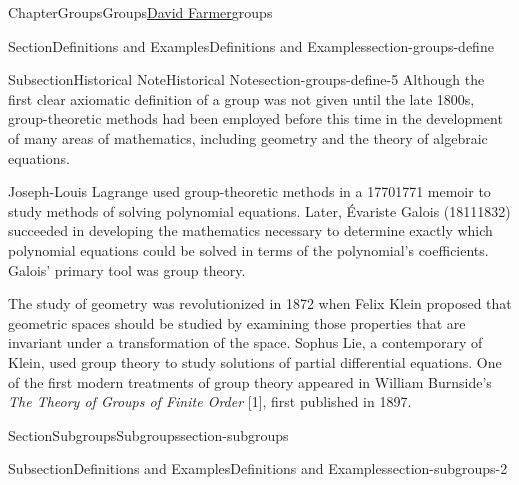 \documentclass[oneside,10pt,]{book}
\newcommand{\pubtitle}[1]{\textsl{#1}}
\numberwithin{equation}{section}
\begin{document}
\begin{chapterptx}{Chapter}{Groups}{}{Groups}{\hyperlink{dfarmer}{David Farmer}}{}{groups}
\begin{sectionptx}{Section}{Definitions and Examples}{}{Definitions and Examples}{}{}{section-groups-define}
\begin{subsectionptx}{Subsection}{Historical Note}{}{Historical Note}{}{}{section-groups-define-5}
Although the first clear axiomatic definition of a group was not given until the late 1800s, group-theoretic methods had been employed before this time in the development of  many areas of mathematics, including geometry and the theory of algebraic equations.%
\par
Joseph-Louis Lagrange used group-theoretic methods in a 1770\textendash{}1771 memoir to study methods of solving polynomial equations.  Later, Évariste Galois (1811\textendash{}1832) succeeded in developing the mathematics necessary to determine exactly which polynomial equations could be  solved in terms of the polynomial's coefficients. Galois' primary tool was group theory.%
\par
The study of geometry was revolutionized in 1872 when Felix Klein proposed that geometric spaces should be studied by examining those properties that are invariant under a transformation of the space. Sophus Lie, a contemporary of Klein, used group theory to study solutions of partial differential equations.  One of the first modern treatments of group theory appeared in William Burnside's \pubtitle{The Theory of Groups of Finite Order} [1], first published in 1897.%
\end{subsectionptx}
\end{sectionptx}
%
%
\typeout{************************************************}
\typeout{************************************************}
%
\begin{sectionptx}{Section}{Subgroups}{}{Subgroups}{}{}{section-subgroups}
%
%
\typeout{************************************************}
\typeout{************************************************}
%
\begin{subsectionptx}{Subsection}{Definitions and Examples}{}{Definitions and Examples}{}{}{section-subgroups-2}

\end{subsectionptx}
\end{sectionptx}
\end{chapterptx}
\end{document}
